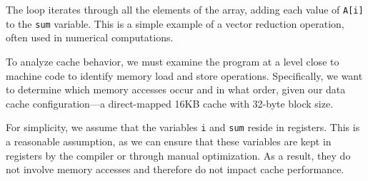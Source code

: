 \documentclass[12pt]{book}
\begin{document}
The loop iterates through all the elements of the array, adding each value of \texttt{A[i]} to the \texttt{sum} variable. This is a simple example of a vector reduction operation, often used in numerical computations.

To analyze cache behavior, we must examine the program at a level close to machine code to identify memory load and store operations. Specifically, we want to determine which memory accesses occur and in what order, given our data cache configuration—a direct-mapped 16KB cache with 32-byte block size.

For simplicity, we assume that the variables \texttt{i} and \texttt{sum} reside in registers. This is a reasonable assumption, as we can ensure that these variables are kept in registers by the compiler or through manual optimization. As a result, they do not involve memory accesses and therefore do not impact cache performance.
\end{document}

